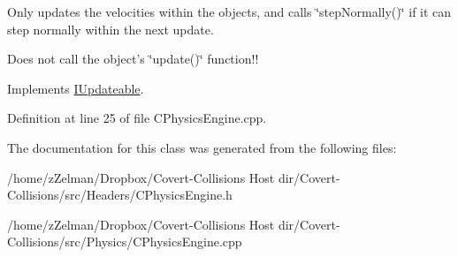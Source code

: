 Only updates the velocities within the objects, and calls \char`\"{}step\-Normally()\char`\"{} if it can step normally within the next update. 

Does not call the object's \char`\"{}update()\char`\"{} function!! 

Implements \hyperlink{classIUpdateable}{I\-Updateable}.



Definition at line 25 of file C\-Physics\-Engine.\-cpp.



The documentation for this class was generated from the following files\-:\begin{DoxyCompactItemize}
\item 
/home/z\-Zelman/\-Dropbox/\-Covert-\/\-Collisions Host dir/\-Covert-\/\-Collisions/src/\-Headers/C\-Physics\-Engine.\-h\item 
/home/z\-Zelman/\-Dropbox/\-Covert-\/\-Collisions Host dir/\-Covert-\/\-Collisions/src/\-Physics/C\-Physics\-Engine.\-cpp\end{DoxyCompactItemize}
